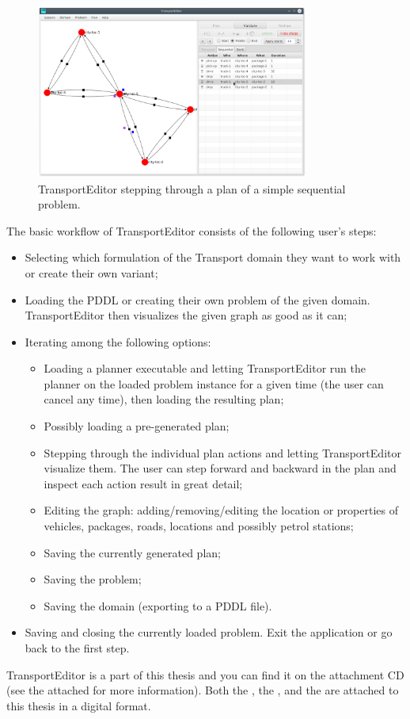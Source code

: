\begin{figure}[tb]
\begin{center}
\includegraphics[width=0.8\textwidth]{../img/transporteditor_screenshot}
\end{center}
\caption{TransportEditor stepping through a plan of a simple sequential problem.}
\label{fig:transporteditor-screenshot}
\end{figure}

The basic workflow of TransportEditor consists of the following user's steps:
\begin{itemize}
\item Selecting which formulation of the Transport domain they want to work with or create their own variant;
\item Loading the PDDL or creating their own problem of the given domain. TransportEditor then visualizes the given graph as good as it can;
\item Iterating among the following options:
\begin{itemize}
\item Loading a planner executable and letting TransportEditor run the planner on the loaded problem instance for a given time (the user can cancel any time),
then loading the resulting plan;
\item Possibly loading a pre-generated plan;
\item Stepping through the individual plan actions and letting TransportEditor visualize them.
The user can step forward and backward in the plan and inspect each action result in great detail;
\item Editing the graph: adding/removing/editing the location or properties of vehicles, packages, roads, locations and possibly petrol stations;
\item Saving the currently generated plan;
\item Saving the problem;
\item Saving the domain (exporting to a PDDL file).
\end{itemize}
\item Saving and closing the currently loaded problem. Exit the application or go back to the first step.
\end{itemize}

TransportEditor is a part of this thesis and you can find it on the attachment CD (see the attached  for more information). Both the ,
the , and the  are attached to this thesis in a digital format.
